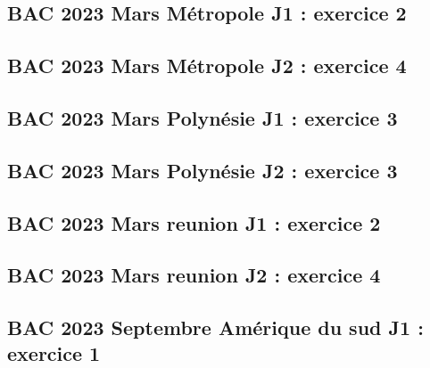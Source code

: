 \documentclass[lang=fr,edition=teacher,layout=sheet]{mxbook}
\begin{document}
\begingroup\endgroup
\par\bigskip
{}\subsection*{BAC 2023 Mars Métropole J1 : exercice 2}
\begingroup\endgroup
\par\bigskip
{}\subsection*{BAC 2023 Mars Métropole J2 : exercice 4}
\begingroup\endgroup
\par\bigskip
{}\subsection*{BAC 2023 Mars Polynésie J1 : exercice 3}
\begingroup\endgroup
\par\bigskip
{}\subsection*{BAC 2023 Mars Polynésie J2 : exercice 3}
\begingroup\endgroup
\par\bigskip
{}\subsection*{BAC 2023 Mars reunion J1 : exercice 2}
\begingroup\endgroup
\par\bigskip
{}\subsection*{BAC 2023 Mars reunion J2 : exercice 4}
\begingroup\endgroup
\par\bigskip
{}\subsection*{BAC 2023 Septembre Amérique du sud J1 : exercice 1}
\end{document}
